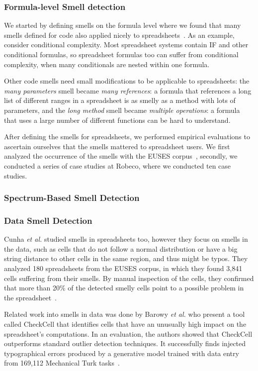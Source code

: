 \documentclass[conference]{IEEEtran}
\begin{document}
\subsubsection{Formula-level Smell detection}
We started by defining smells on the formula level where we found that many smells defined for code also applied nicely to spreadsheets~\cite{hermans_detecting_2014}. As an example, consider conditional complexity. Most spreadsheet systems contain IF and other conditional formulas, so spreadsheet formulas too can suffer from conditional complexity, when many conditionals are nested within one formula.

Other code smells need small modifications to be applicable to spreadsheets: the \emph{many parameters} smell became \emph{many references}: a formula that references a long list of different ranges in a spreadsheet is as smelly as a method with lots of parameters, and the \emph{long method} smell became \emph{multiple operations}: a formula that uses a large number of different functions can be hard to understand.

After defining the smells for spreadsheets, we performed empirical evaluations to ascertain ourselves that the smells mattered to spreadsheet users. We first analyzed the occurrence of the smells with the EUSES corpus~\cite{fisher_euses_2005}, secondly, we conducted a series of case studies at Robeco, where we conducted ten case studies. 

\subsubsection{Spectrum-Based Smell Detection}

\subsubsection{Data Smell Detection}
Cunha \emph{et al.} studied smells in spreadsheets too, however they focus on smells in the data, such as cells that do not follow a normal distribution or have a big string distance to other cells in the same region, and thus might be typos. They analyzed 180 spreadsheets from the EUSES corpus, in which they found 3,841 cells suffering from their smells. By manual inspection of the cells, they confirmed that more than 20\% of the detected smelly cells point to a possible problem in the spreadsheet~\cite{cunha_towards_2012}.

Related work into smells in data was done by Barowy \emph{et al.} who present a tool called CheckCell that identifies cells that have an unusually high impact on the spreadsheet’s computations. In an evaluation, the authors showed that CheckCell outperforms standard outlier detection techniques. It successfully finds injected typographical errors produced by a generative model trained with data entry from 169,112 Mechanical Turk tasks~\cite{barowy_checkcell:_2014}.
\end{document}
